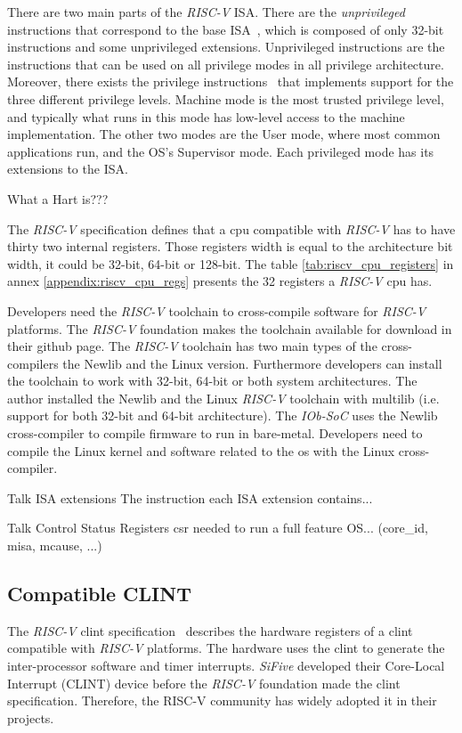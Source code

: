 There are two main parts of the \textit{RISC-V} ISA. There are the \textit{unprivileged} instructions that correspond to the base ISA~\cite{riscv_unpriviledge}, which is composed of only 32-bit instructions and some unprivileged extensions. {Unprivileged instructions} are the instructions that can be used on all privilege modes in all privilege architecture. Moreover, there exists the privilege instructions~\cite{riscv_priviledge} that implements support for the three different privilege levels. Machine mode is the most trusted privilege level, and typically what runs in this mode has low-level access to the machine implementation. The other two modes are the User mode, where most common applications run, and the OS's Supervisor mode. Each privileged mode has its extensions to the ISA.

What a Hart is???

The \textit{RISC-V} specification defines that a \acrshort{cpu} compatible with \textit{RISC-V} has to have thirty two internal registers. Those registers width is equal to the architecture bit width, it could be 32-bit, 64-bit or 128-bit. The table \ref{tab:riscv_cpu_registers} in annex \ref{appendix:riscv_cpu_regs} presents the 32 registers a \textit{RISC-V} \acrshort{cpu} has.

Developers need the \textit{RISC-V} toolchain to cross-compile software for \textit{RISC-V} platforms. The \textit{RISC-V} foundation makes the toolchain available for download in their github page. The \textit{RISC-V} toolchain has two main types of the cross-compilers the Newlib and the Linux version. Furthermore developers can install the toolchain to work with 32-bit, 64-bit or both system architectures. The author installed the Newlib and the Linux \textit{RISC-V} toolchain with multilib (i.e. support for both 32-bit and 64-bit architecture). The \textit{IOb-SoC} uses the Newlib cross-compiler to compile firmware to run in bare-metal. Developers need to compile the Linux kernel and software related to the \acrshort{os} with the Linux cross-compiler.

Talk ISA extensions
The instruction each ISA extension contains...

Talk Control Status Registers
\acrfull{csr} needed to run a full feature OS... (core\_id, misa, mcause, ...)

\subsection{Compatible CLINT}
\label{subsection:clint_riscv}
The \textit{RISC-V} \acrshort{clint} specification~\cite{clint_riscv_spec} describes the hardware registers of a \acrfull{clint} compatible with \textit{RISC-V} platforms. The hardware uses the \acrshort{clint} to generate the inter-processor software and timer interrupts. \textit{SiFive} developed their Core-Local Interrupt (CLINT) device before the \textit{RISC-V} foundation made the \acrshort{clint} specification. Therefore, the RISC-V community has widely adopted it in their projects.

